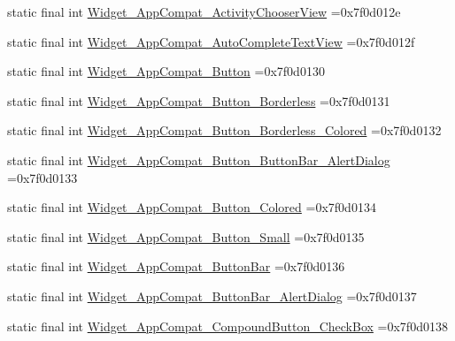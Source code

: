 \begin{DoxyCompactItemize}
\item 
static final int \mbox{\hyperlink{classcom_1_1example_1_1trainawearapplication_1_1_r_1_1style_afc283ee9ec40375d57e8b78cccdf00b0}{Widget\+\_\+\+App\+Compat\+\_\+\+Activity\+Chooser\+View}} =0x7f0d012e
\item 
static final int \mbox{\hyperlink{classcom_1_1example_1_1trainawearapplication_1_1_r_1_1style_a051f84c245f6f87ea9ac4ae65f2260c6}{Widget\+\_\+\+App\+Compat\+\_\+\+Auto\+Complete\+Text\+View}} =0x7f0d012f
\item 
static final int \mbox{\hyperlink{classcom_1_1example_1_1trainawearapplication_1_1_r_1_1style_a4aa4e00f25a89d1091a9872cbcb5328f}{Widget\+\_\+\+App\+Compat\+\_\+\+Button}} =0x7f0d0130
\item 
static final int \mbox{\hyperlink{classcom_1_1example_1_1trainawearapplication_1_1_r_1_1style_a54bcb95dab9c5b3498c49f877add3750}{Widget\+\_\+\+App\+Compat\+\_\+\+Button\+\_\+\+Borderless}} =0x7f0d0131
\item 
static final int \mbox{\hyperlink{classcom_1_1example_1_1trainawearapplication_1_1_r_1_1style_a7bfd79f7d3f4fa19c914b3caf57c93c7}{Widget\+\_\+\+App\+Compat\+\_\+\+Button\+\_\+\+Borderless\+\_\+\+Colored}} =0x7f0d0132
\item 
static final int \mbox{\hyperlink{classcom_1_1example_1_1trainawearapplication_1_1_r_1_1style_a19eabf37b1ea9c419db0f93cb6288d1f}{Widget\+\_\+\+App\+Compat\+\_\+\+Button\+\_\+\+Button\+Bar\+\_\+\+Alert\+Dialog}} =0x7f0d0133
\item 
static final int \mbox{\hyperlink{classcom_1_1example_1_1trainawearapplication_1_1_r_1_1style_a999b5b80c43c119eb0434f7ad0c10186}{Widget\+\_\+\+App\+Compat\+\_\+\+Button\+\_\+\+Colored}} =0x7f0d0134
\item 
static final int \mbox{\hyperlink{classcom_1_1example_1_1trainawearapplication_1_1_r_1_1style_aff05e97f4c9573973b8301599581b89b}{Widget\+\_\+\+App\+Compat\+\_\+\+Button\+\_\+\+Small}} =0x7f0d0135
\item 
static final int \mbox{\hyperlink{classcom_1_1example_1_1trainawearapplication_1_1_r_1_1style_a5af7dba7f262e97d6f95a85e9e1ebdd3}{Widget\+\_\+\+App\+Compat\+\_\+\+Button\+Bar}} =0x7f0d0136
\item 
static final int \mbox{\hyperlink{classcom_1_1example_1_1trainawearapplication_1_1_r_1_1style_af07f44611408c761389ccf98227c02f3}{Widget\+\_\+\+App\+Compat\+\_\+\+Button\+Bar\+\_\+\+Alert\+Dialog}} =0x7f0d0137
\item 
static final int \mbox{\hyperlink{classcom_1_1example_1_1trainawearapplication_1_1_r_1_1style_aa78b29aac488441c444a78d374e7c5cf}{Widget\+\_\+\+App\+Compat\+\_\+\+Compound\+Button\+\_\+\+Check\+Box}} =0x7f0d0138

\end{DoxyCompactItemize}
